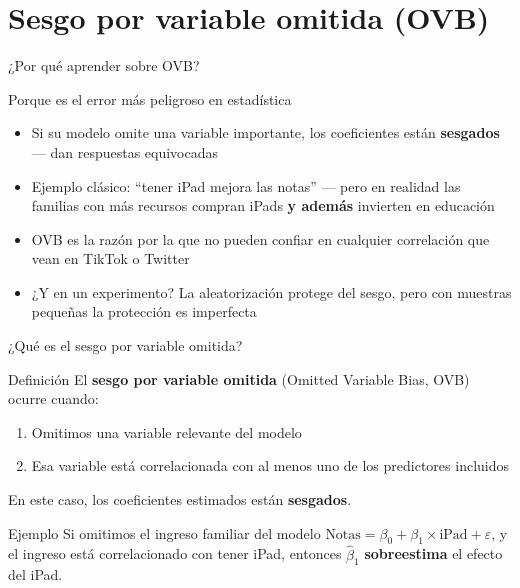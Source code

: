 \documentclass[aspectratio=169, 11pt]{beamer}
\begin{document}
\section{Sesgo por variable omitida (OVB)}

\begin{frame}{¿Por qué aprender sobre OVB?}
\begin{exampleblock}{Porque es el error más peligroso en estadística}
\small
\begin{itemize}\setlength{\itemsep}{2pt}
  \item Si su modelo omite una variable importante, los coeficientes están \textbf{sesgados} --- dan respuestas equivocadas
  \item Ejemplo clásico: ``tener iPad mejora las notas'' --- pero en realidad las familias con más recursos compran iPads \textbf{y además} invierten en educación
  \item OVB es la razón por la que no pueden confiar en cualquier correlación que vean en TikTok o Twitter
  \item ¿Y en un experimento? La aleatorización protege del sesgo, pero con muestras pequeñas la protección es imperfecta
\end{itemize}
\end{exampleblock}
\end{frame}

\begin{frame}{¿Qué es el sesgo por variable omitida?}
\begin{block}{Definición}
El \textbf{sesgo por variable omitida} (Omitted Variable Bias, OVB) ocurre cuando:
\begin{enumerate}
  \item Omitimos una variable relevante del modelo
  \item Esa variable está correlacionada con al menos uno de los predictores incluidos
\end{enumerate}
En este caso, los coeficientes estimados están \textbf{sesgados}.
\end{block}

\vspace{0.1cm}
\begin{exampleblock}{Ejemplo}
\small Si omitimos el ingreso familiar del modelo $\text{Notas} = \beta_0 + \beta_1 \times \text{iPad} + \varepsilon$, y el ingreso está correlacionado con tener iPad, entonces $\hat{\beta}_1$ \textbf{sobreestima} el efecto del iPad.
\end{exampleblock}
\end{frame}
\end{document}
